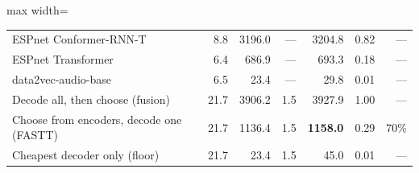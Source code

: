 \begin{table}[t]
\begin{adjustbox}{max width=\linewidth}
\begin{tabular}{lrrrrrr}
        \quad ESPnet Conformer-RNN-T & 8.8 & 3196.0 & --- & 3204.8 & 0.82 & --- \\
        \quad ESPnet Transformer & 6.4 & 686.9 & --- & 693.3 & 0.18 & --- \\
        \quad data2vec-audio-base & 6.5 & 23.4 & --- & 29.8 & 0.01 & --- \\
        Decode all, then choose (fusion) & 21.7 & 3906.2 & 1.5 & 3927.9 & 1.00 & --- \\
        Choose from encoders, decode one (FASTT) & 21.7 & 1136.4 & 1.5 & \textbf{1158.0} & 0.29 & 70\% \\
        Cheapest decoder only (floor) & 21.7 & 23.4 & 1.5 & 45.0 & 0.01 & --- \\
        \bottomrule
    \end{tabular}
    \end{adjustbox}
\end{table}
